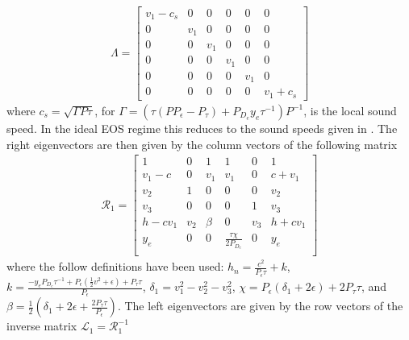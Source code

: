 \documentclass[onecolumn]{aastex62}
\begin{document}
\begin{align}
\Lambda =
\begin{bmatrix}
  v_{1} - c_{s} & 0 & 0& 0& 0& 0 \\
  0 & v_{1} & 0 & 0 & 0 & 0      \\
  0 & 0 & v_{1} & 0 & 0 & 0      \\
  0 & 0 & 0 & v_{1} & 0 & 0      \\
  0 & 0 & 0 & 0 & v_{1} & 0      \\
  0 & 0 & 0 & 0 & 0 & v_{1} + c_{s}
\end{bmatrix}
\end{align}
where $c_{s} = \sqrt{\Gamma P \tau}$, for
$\Gamma = \left(\tau (P P_{\epsilon} - P_{\tau}) + P_{D_e} y_{e} \tau^{-1}\right) P^{-1}$, is
the local sound speed. In the ideal EOS regime this reduces to the sound speeds given in \citet{colella:1985}.
The right eigenvectors are then given by the column vectors of the following matrix
\begin{align*}
  \mathcal{R}_{1} =
  \left[
  \begin{array}{cccccc}
   1 & 0 & 1 & 1 & 0 & 1 \\
   v_{1}-c & 0 & v_{1} & v_{1} & 0 & c+v_{1} \\
   v_{2} & 1 & 0 & 0 & 0 & v_{2} \\
   v_{3} & 0 & 0 & 0 & 1 & v_{3} \\
   h-c v_{1} & v_{2} & \beta & 0 & v_{3} & h+c v_{1} \\
   y_{e}  & 0 & 0 & \frac{\tau  \chi }{2 P_{D_{e}}} & 0 & y_{e}  \\
  \end{array}
  \right]
\end{align*}
where the follow definitions have been used:
$h_{n} = \frac{c^2}{P_{\epsilon}\tau} + k $, $k = \frac{-y_{e} P_{D_{e}} \tau^{-1}
+ P_{\epsilon} (\frac{1}{2}v^2 + \epsilon) + P_{\tau}\tau}{P_{\epsilon}}$,
$\delta_{1} = v_{1}^{2}-v_{2}^{2}-v_{3}^{2}$,
$\chi = P_{\epsilon} ( \delta_{1} + 2\epsilon) + 2P_{\tau}\tau$, and
$\beta = \frac{1}{2} (\delta_{1}+2 \epsilon +\frac{2 P_{\tau} \tau }{P_{\epsilon}})$.
The left eigenvectors are given by the row vectors of the inverse matrix $\mathcal{L}_{1} = \mathcal{R}_{1}^{-1}$
\end{document}
